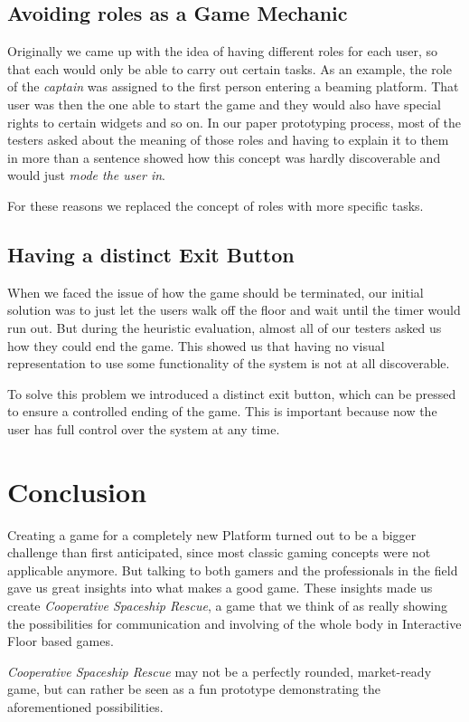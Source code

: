 \documentclass{sigchi}
\begin{document}
\subsection{Avoiding roles as a Game Mechanic}
\vspace{1mm}
Originally we came up with the idea of having different roles for each user, so that each would only be able to carry out certain tasks. As an example, the role of the \textit{captain} was assigned to the first person entering a beaming platform. That user was then the one able to start the game and they would also have special rights to certain widgets and so on. In our paper prototyping process, most of the testers asked about the meaning of those roles and having to explain it to them in more than a sentence showed how this concept was hardly discoverable and would just \textit{mode the user in}.

For these reasons we replaced the concept of roles with more specific tasks.

\subsection{Having a distinct Exit Button}
\vspace{1mm}
When we faced the issue of how the game should be terminated, our initial solution was to just let the users walk off the floor and wait until the timer would run out. But during the heuristic evaluation, almost all of our testers asked us how they could end the game. This showed us that having no visual representation to use some functionality of the system is not at all discoverable. 

To solve this problem we introduced a distinct exit button, which can be pressed to ensure a controlled ending of the game. This is important because now the user has full control over the system at any time. 

\section{Conclusion}
\vspace{1mm}

Creating a game for a completely new Platform turned out to be a bigger challenge than first anticipated, since most classic gaming concepts were not applicable anymore. But talking to both gamers and the professionals in the field gave us great insights into what makes a good game. These insights made us create \textit{Cooperative Spaceship Rescue}, a game that we think of as really showing the possibilities for communication and involving of the whole body in Interactive Floor based games. \newline


\textit{Cooperative Spaceship Rescue} may not be a perfectly rounded, market-ready game, but can rather be seen as a fun prototype demonstrating the aforementioned possibilities.


\balance
\end{document}
